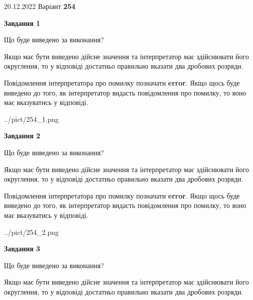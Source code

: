 \documentclass[12pt, ukrainian]{article}
\begin{document}
{20.12.2022 Варіант \No \textbf { 254 }\par}
{
\begin {Large}

{\begin {center}\textbf{Завдання 1}\end {center}}\par
Що буде виведено за виконання? \par

Якщо має бути виведено дійсне значення та інтерпретатор має здійснювати його округлення, 
то у відповіді достатньо правильно вказати два дробових розряди.

Повідомлення інтерпретатора про помилку позначати \textbf{error}.
Якщо щось буде виведено до того, як інтерпретатор видасть повідомлення про помилку, 
то воно має вказуватись у відповіді. \par

\begin{center}
	{../pict/254_1.png}
\end{center}
\newpage

{\begin {center}\textbf{Завдання 2}\end {center}}\par
Що буде виведено за виконання? \par

Якщо має бути виведено дійсне значення та інтерпретатор має здійснювати його округлення, 
то у відповіді достатньо правильно вказати два дробових розряди.

Повідомлення інтерпретатора про помилку позначати \textbf{error}.
Якщо щось буде виведено до того, як інтерпретатор видасть повідомлення про помилку, 
то воно має вказуватись у відповіді. \par

\begin{center}
	{../pict/254_2.png}
\end{center}
\newpage

{\begin {center}\textbf{Завдання 3}\end {center}}\par
Що буде виведено за виконання? \par

Якщо має бути виведено дійсне значення та інтерпретатор має здійснювати його округлення, 
то у відповіді достатньо правильно вказати два дробових розряди.


\end{Large}}
\end{document}
